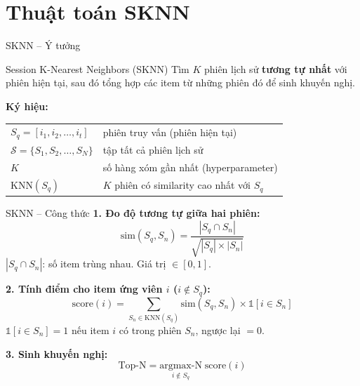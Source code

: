 \documentclass[aspectratio=169, 11pt]{beamer}
\begin{document}
\section{Thuật toán SKNN}

\begin{frame}{SKNN -- Ý tưởng}
\begin{block}{Session K-Nearest Neighbors (SKNN)}
Tìm $K$ phiên lịch sử \textbf{tương tự nhất} với phiên hiện tại, sau đó tổng hợp các item từ những phiên đó để sinh khuyến nghị.
\end{block}

\vspace{0.4cm}
\textbf{Ký hiệu:}
\begin{table}
\centering
\small
\begin{tabular}{ll}
$S_q = [i_1, i_2, \ldots, i_t]$ & phiên truy vấn (phiên hiện tại) \\
$\mathcal{S} = \{S_1, S_2, \ldots, S_N\}$ & tập tất cả phiên lịch sử \\
$K$ & số hàng xóm gần nhất (hyperparameter) \\
$\text{KNN}(S_q)$ & $K$ phiên có similarity cao nhất với $S_q$ \\
\end{tabular}
\end{table}
\end{frame}

\begin{frame}{SKNN -- Công thức}
\textbf{1. Đo độ tương tự giữa hai phiên:}
\begin{equation}
\text{sim}(S_q, S_n) = \frac{|S_q \cap S_n|}{\sqrt{|S_q| \times |S_n|}}
\end{equation}
\small
$|S_q \cap S_n|$: số item trùng nhau. \quad Giá trị $\in [0, 1]$.

\vspace{0.4cm}
\normalsize
\textbf{2. Tính điểm cho item ứng viên $i$ ($i \notin S_q$):}
\begin{equation}
\text{score}(i) = \sum_{S_n \in \text{KNN}(S_q)} \text{sim}(S_q, S_n) \times \mathbb{1}[i \in S_n]
\end{equation}
\small
$\mathbb{1}[i \in S_n] = 1$ nếu item $i$ có trong phiên $S_n$, ngược lại $= 0$.

\vspace{0.4cm}
\normalsize
\textbf{3. Sinh khuyến nghị:}
\begin{equation}
\text{Top-N} = \underset{i \notin S_q}{\text{argmax-N}} \; \text{score}(i)
\end{equation}
\end{frame}
\end{document}
